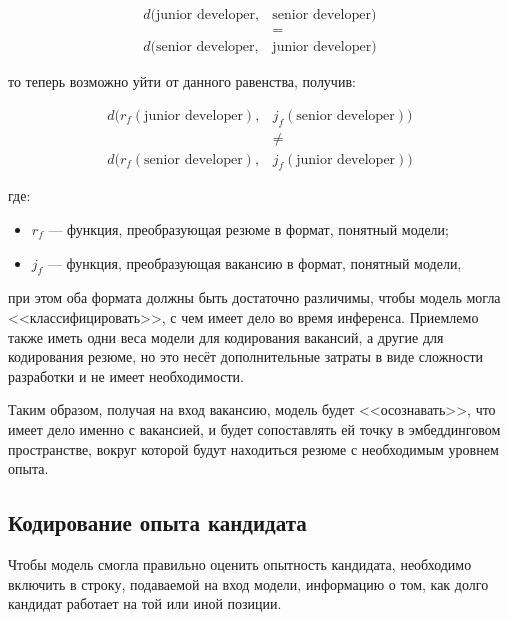\documentclass[14pt]{mmcs_article}
\begin{document}
\begin{equation}
  \label{eq:assymetric_search_problem}
  \begin{aligned}
    d(\text{junior developer}, & \text{senior developer}) \\
                               & =                        \\
    d(\text{senior developer}, & \text{junior developer})
  \end{aligned}
\end{equation}

то теперь возможно уйти от данного равенства, получив:

\begin{equation}
  \label{eq:solved_assymetric_search_problem}
  \begin{aligned}
    d(r_{f}(\text{junior developer}), & j_{f}(\text{senior developer})) \\
                                      & \neq                            \\
    d(r_{f}(\text{senior developer}), & j_{f}(\text{junior developer}))
  \end{aligned}
\end{equation}

где:
\begin{itemize}
  \item $r_{f}$ --- функция, преобразующая резюме в формат, понятный модели;
  \item $j_{f}$ --- функция, преобразующая вакансию в формат, понятный модели,
\end{itemize}

при этом оба формата должны быть достаточно различимы, чтобы модель могла <<классифицировать>>,  с чем имеет дело во время инференса. Приемлемо также иметь одни веса модели для кодирования вакансий, а другие для кодирования резюме, но это несёт дополнительные затраты в виде сложности разработки и не имеет необходимости.

Таким образом, получая на вход вакансию, модель будет <<осознавать>>, что имеет дело именно с вакансией, и будет сопоставлять ей точку в эмбеддинговом пространстве, вокруг которой будут находиться резюме с необходимым уровнем опыта.

\subsection*{Кодирование опыта кандидата}

Чтобы модель смогла правильно оценить опытность кандидата, необходимо включить в строку, подаваемой на вход модели, информацию о том, как долго кандидат работает на той или иной позиции.
\end{document}
